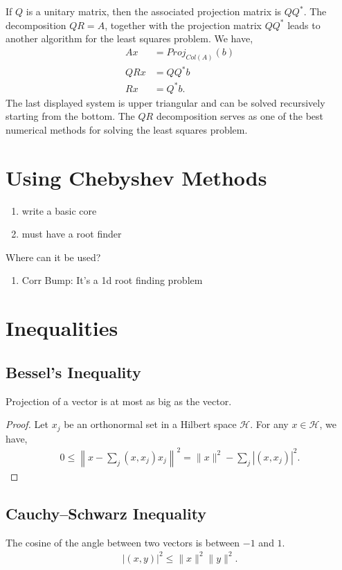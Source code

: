 \documentclass{amsart}
\theoremstyle{plain}
\numberwithin{equation}{section}
\begin{document}
If $Q$ is a unitary matrix, then the associated projection matrix 
is $QQ^*$. The decomposition $QR=A$, together with the projection matrix 
$QQ^*$ leads to another algorithm for the least squares problem. We have,
\begin{align*}
Ax &= Proj_{Col(A)}(b)\\
QRx &= QQ^*b\\
Rx &= Q^*b.
\end{align*}
The last displayed system is upper triangular and can be solved recursively 
starting from the bottom. The $QR$ decomposition serves 
as one of the best numerical methods for solving the least squares problem. 

\section{Using Chebyshev Methods}
\begin{enumerate}
\item write a basic core
\item must have a root finder
\end{enumerate}

Where can it be used?
\begin{enumerate}
\item Corr Bump: It's a 1d root finding problem
\end{enumerate}

\section*{Inequalities}
\subsection*{Bessel's Inequality}
Projection of a vector is at most as big 
as the vector. 
\begin{proof}
Let ${x_j}$ be an orthonormal set in a Hilbert space $\mathcal{H}$.
For any $x \in \mathcal{H}$, we have, 
\begin{align*}
0 \leq \left\|x - \sum_{j}(x, x_j) x_j\right\|^2 = 
\|x\|^2 - \sum_{j}|(x, x_j)|^2.
\end{align*}
\end{proof}

\subsection*{Cauchy--Schwarz Inequality}
The cosine of the angle between two vectors is 
between $-1$ and $1$. 
\begin{align*}
|(x, y)|^2 \leq \|x\|^2 \|y\|^2.
\end{align*}
\end{document}
